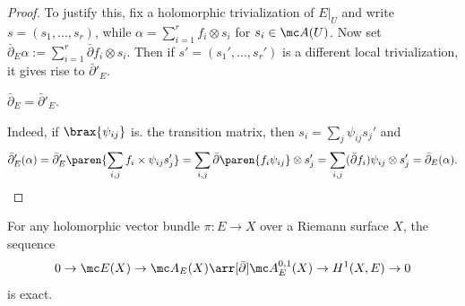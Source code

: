 \documentclass[11pt]{report}
\begin{document}
\begin{proof}
To justify this, fix a holomorphic trivialization of $E|_U$ and write $s=(s_1,\dots,s_r)$, while $\alpha = \sum_{i=1}^r f_i \otimes s_i$ for $s_i \in \mc A(U)$. Now set $\bar \partial_E \alpha := \sum_{i=1}^r \bar \partial f_i \otimes s_i$. Then if $s'=(s_1',\dots,s_r')$ is a different local trivialization, it gives rise to $\bar \partial '_E$.
\begin{claim}
$\bar \partial_E = \bar \partial '_E$.
\end{claim}
Indeed, if $\brax{\psi_{ij}}$ is. the transition matrix, then $s_i = \sum_j \psi_{ij}s_j'$
and
\[
\bar \partial _E'(\alpha) = \bar \partial'_E\paren{ \sum_{i,j}f_i \times \psi_{ij}s_j' } = \sum_{i,j}\bar \partial \paren{f_i \psi_{ij}} \otimes s_j' = \sum_{i,j} (\bar \partial f_i)\psi_{ij}\otimes s_j' = \bar \partial _E(\alpha).
\]
\end{proof}

\begin{thm}
For any holomorphic vector bundle $\pi:E \to X$ over a Riemann surface $X$, the sequence
\[
0 \to \mc E(X) \to \mc A_E(X) \arr[\bar \partial] \mc A_E^{0,1}(X) \to H^1(X,E)\to 0
\]
is exact.
\end{thm}
\end{document}
